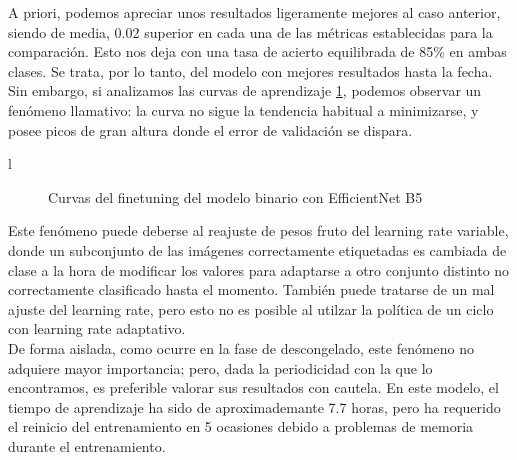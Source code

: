 A priori, podemos apreciar unos resultados ligeramente mejores al caso anterior, siendo de media, 0.02 superior en cada una de las métricas establecidas para la comparación. Esto nos deja con una tasa de acierto equilibrada de 85\% en ambas clases. Se trata, por lo tanto, del modelo con mejores resultados hasta la fecha. Sin embargo, si analizamos las curvas de aprendizaje \ref{fig:curvasefnetbinaria}, podemos observar un fenómeno llamativo: la curva no sigue la tendencia habitual a minimizarse, y posee picos de gran altura donde el error de validación se dispara.

l\begin{figure}[H]
	\centering
	\caption{Curvas del finetuning del modelo binario con EfficientNet B5}
	\label{fig:curvasefnetbinaria}
\end{figure}

Este fenómeno puede deberse al reajuste de pesos fruto del learning rate variable, donde un subconjunto de las imágenes correctamente etiquetadas es cambiada de clase a la hora de modificar los valores para adaptarse a otro conjunto distinto no correctamente clasificado hasta el momento. También puede tratarse de un mal ajuste del learning rate, pero esto no es posible al utilzar la política de un ciclo con learning rate adaptativo.\\

De forma aislada, como ocurre en la fase de descongelado, este fenómeno no adquiere mayor importancia; pero, dada la periodicidad con la que lo encontramos, es preferible valorar sus resultados con cautela. En este modelo, el tiempo de aprendizaje ha sido de aproximademante 7.7 horas, pero ha requerido el reinicio del entrenamiento en 5 ocasiones debido a problemas de memoria durante el entrenamiento.

